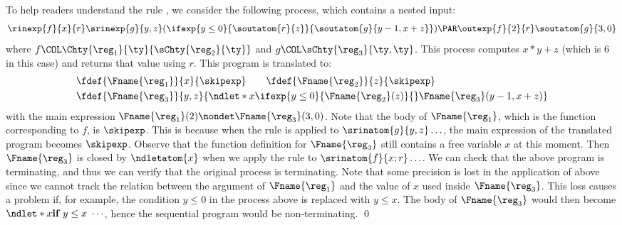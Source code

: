 \begin{example}
\label{ex:nested_rep}
To help readers understand the rule , we consider the following process, which contains a nested input:
\begin{align*}
 \rinexp{f}{x}{r}\srinexp{g}{y, z}(\ifexp{y \leq 0}{\soutatom{r}{z}}{\soutatom{g}{y - 1, x + z}} ) \PAR \outexp{f}{2}{r}\soutatom{g}{3,0}
\end{align*}
%
where \( f \COL \Chty{\reg_1}{\ty}{\sChty{\reg_2}{\ty}} \) and \( g \COL \sChty{\reg_3}{\ty, \ty} \).
This process computes \( x * y + z \) (which is \( 6 \) in this case) and returns that value using \( r \).
This program is translated to:
\begin{align*}
  &\fdef{\Fname{\reg_1}}{x}{\skipexp}\qquad \fdef{\Fname{\reg_2}}{z}{\skipexp} \\
  &\fdef{\Fname{\reg_3}}{y, z}{\ndlet*{x}{\ifexp{y \leq 0}{\Fname{\reg_2}(z)}{} } \Fname{\reg_3}(y - 1, x + z)}
\end{align*}
with the main expression  \( \Fname{\reg_1}(2) \nondet \Fname{\reg_3}(3, 0) \).
Note that the body of \( \Fname{\reg_1}\), which is the function corresponding to \( f \), is \( \skipexp \).
This is because when the rule  is applied to 
\( \srinatom{g}{y, z}\ldots\),
the main expression of the translated program becomes \( \skipexp \).
Observe that the function definition for \( \Fname{\reg_3} \) still contains a free variable \( x \) at this moment.
Then \( \Fname{\reg_3} \) is closed by \( \ndletatom{x} \) when we apply the rule  to \( \srinatom{f}{x; r}\ldots \).
%
We can check that the above program is terminating, and thus we can verify that the original process is terminating.
%
Note that some precision is lost in the application of  above
since we cannot track the relation between the argument of \( \Fname{\reg_1} \)
and the value of \( x \) used inside \( \Fname{\reg_3}\). This loss causes a problem if, for example, the condition \(y\le 0\) in
  the process above is replaced with \(y\le x\). The body of
  \(\Fname{\reg_3}\) would then become
  \(\ndlet*{x}{\textbf{if } y\le x\ \cdots}\), hence the sequential program would be
    non-terminating.
 \qed
\end{example}

